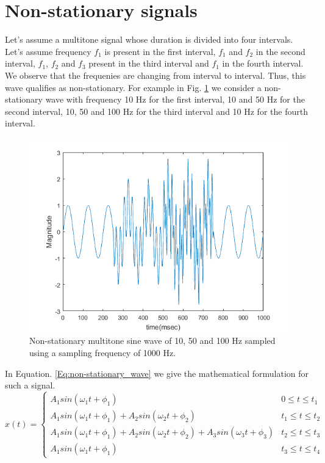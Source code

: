 \section{Non-stationary signals}
Let's assume a multitone signal whose duration is divided into four intervals. Let's assume frequency $f_1$ is present in the first interval, $f_1$ and $f_2$ in the second interval, $f_1$, $f_2$ and $f_3$ present in the third interval and $f_1$ in the fourth interval. We observe that the frequenies are changing from interval to interval. Thus, this wave qualifies as non-stationary. For example in Fig. \ref{Fig:non-stationary} we consider a non-stationary wave with frequency 10 Hz for the first interval, 10 and 50 Hz for the second interval, 10, 50 and 100 Hz for the third interval and 10 Hz for the fourth interval.
\begin{figure}[h!]
\includegraphics[width=15cm,left,keepaspectratio]{figures/non-stationary}
\caption{Non-stationary multitone sine wave of 10, 50 and 100 Hz sampled using a sampling frequency of 1000 Hz.}
\label{Fig:non-stationary}
\end{figure}
In Equation. \ref{Eq:non-stationary_wave} we give the mathematical formulation for such a signal. 
\begin{equation}
x(t) =
\begin{cases} A_1sin(\omega_1t + \phi_1) & 0 \leq t \leq t_1 \\
      A_1sin(\omega_1t + \phi_1) + A_2sin(\omega_2 t + \phi_2) & t_1 \leq t \leq t_2 \\
      A_1sin(\omega_1t + \phi_1) + A_2sin(\omega_2 t + \phi_2) +A_3sin(\omega_3 t + \phi_3) & t_2 \leq t \leq t_3 \\
      A_1sin(\omega_1t + \phi_1) & t_3 \leq t \leq t_4
\end{cases}
\label{Eq:non-stationary_wave}
\end{equation}
